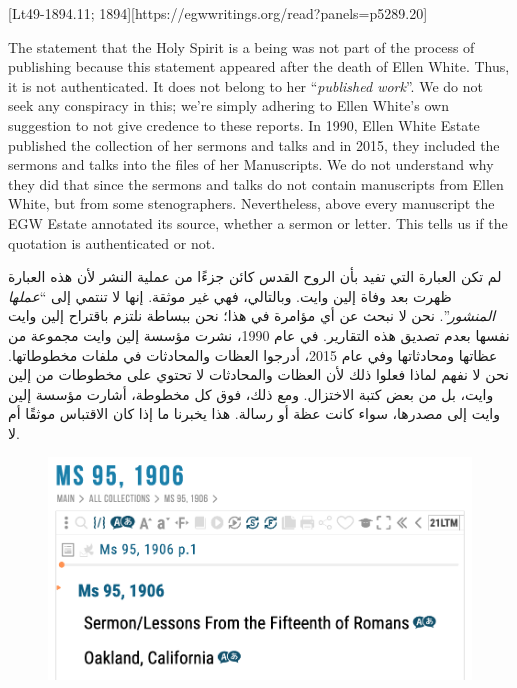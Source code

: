 [Lt49-1894.11; 1894][https://egwwritings.org/read?panels=p5289.20]


The statement that the Holy Spirit is a being was not part of the process of publishing because this statement appeared after the death of Ellen White. Thus, it is not authenticated. It does not belong to her “\textit{published work}”. We do not seek any conspiracy in this; we’re simply adhering to Ellen White’s own suggestion to not give credence to these reports. In 1990, Ellen White Estate published the collection of her sermons and talks and in 2015, they included the sermons and talks into the files of her Manuscripts. We do not understand why they did that since the sermons and talks do not contain manuscripts from Ellen White, but from some stenographers. Nevertheless, above every manuscript the EGW Estate annotated its source, whether a sermon or letter. This tells us if the quotation is authenticated or not.


لم تكن العبارة التي تفيد بأن الروح القدس كائن جزءًا من عملية النشر لأن هذه العبارة ظهرت بعد وفاة إلين وايت. وبالتالي، فهي غير موثقة. إنها لا تنتمي إلى “\textit{عملها المنشور}”. نحن لا نبحث عن أي مؤامرة في هذا؛ نحن ببساطة نلتزم باقتراح إلين وايت نفسها بعدم تصديق هذه التقارير. في عام 1990، نشرت مؤسسة إلين وايت مجموعة من عظاتها ومحادثاتها وفي عام 2015، أدرجوا العظات والمحادثات في ملفات مخطوطاتها. نحن لا نفهم لماذا فعلوا ذلك لأن العظات والمحادثات لا تحتوي على مخطوطات من إلين وايت، بل من بعض كتبة الاختزال. ومع ذلك، فوق كل مخطوطة، أشارت مؤسسة إلين وايت إلى مصدرها، سواء كانت عظة أو رسالة. هذا يخبرنا ما إذا كان الاقتباس موثقًا أم لا.


\begin{figure}
    \centering
    \includegraphics[width=1\linewidth]{images/sermons-and-talks.png}
    \label{fig:enter-label}
\end{figure}



